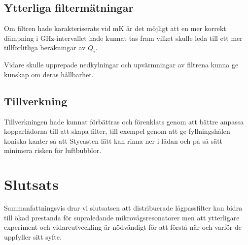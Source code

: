 \documentclass[main.tex]{subfiles}
\begin{document}
\subsection{Ytterliga filtermätningar}
Om filtren hade karakteriserats vid \unit[10]{mK} är det möjligt att en mer korrekt dämpning i \unit[4-8]{GHz}-intervallet hade kunnat tas fram vilket skulle leda till ett mer tillförlitliga beräkningar av $Q_i$.

Vidare skulle upprepade nedkylningar och upvärmningar av filtrena kunna ge kunskap om deras hållbarhet.

\subsection{Tillverkning}
Tillverkningen hade kunnat förbättras och förenklats genom att bättre anpassa kopparlådorna till att skapa filter, till exempel genom att ge fyllningshålen koniska kanter så att Stycasten lätt kan rinna ner i lådan och på så sätt minimera risken för luftbubblor.  

\section{Slutsats}
Sammanfattningsvis drar vi slutsatsen att distribuerade lågpassfilter kan bidra till ökad prestanda för supraledande mikrovågsresonatorer men att ytterligare experiment och vidareutveckling är nödvändigt för att förstå när och varför de uppfyller sitt syfte.
\end{document}
